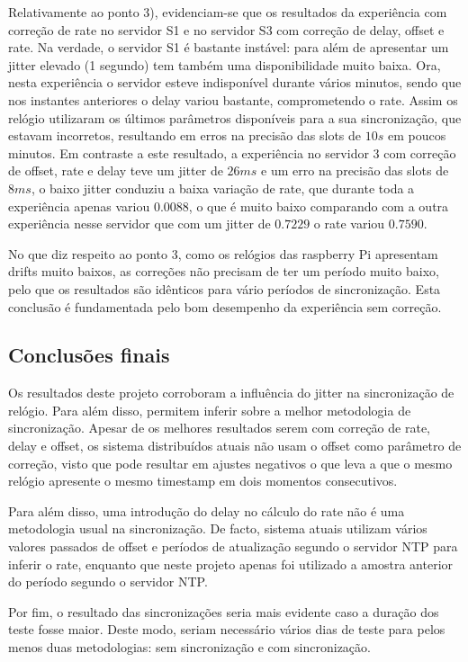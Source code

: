 Relativamente ao ponto 3), evidenciam-se que os resultados da experiência com correção de rate no servidor S1 e no servidor S3 com correção de delay, offset e rate. Na verdade, o servidor S1 é bastante instável: para além de apresentar um jitter elevado (1 segundo) tem também uma disponibilidade muito baixa. Ora, nesta experiência o servidor esteve indisponível durante vários minutos, sendo que nos instantes anteriores o delay variou bastante, comprometendo o rate. Assim os relógio utilizaram os últimos parâmetros disponíveis para a sua sincronização, que estavam incorretos, resultando em erros na precisão das slots de $10 s$ em poucos minutos. Em contraste a este resultado, a experiência no servidor 3 com correção de offset, rate e delay teve um jitter de $26 ms$ e um erro na precisão das slots de $8 ms$, o baixo jitter conduziu a baixa variação de rate, que durante toda a experiência apenas variou $0.0088$, o que é muito baixo comparando com a outra experiência nesse servidor que com um jitter de $0.7229$ o rate variou $0.7590$.

No que diz respeito ao ponto 3, como os relógios das raspberry Pi apresentam drifts muito baixos, as correções não precisam de ter um período muito baixo, pelo que os resultados são idênticos para vário períodos de sincronização. Esta conclusão é fundamentada pelo bom desempenho da experiência sem correção.

\subsection{Conclusões finais}

Os resultados deste projeto corroboram a influência do jitter na sincronização de relógio. Para além disso, permitem inferir sobre a melhor metodologia de sincronização. Apesar de os melhores resultados serem com correção de rate, delay e offset, os sistema distribuídos atuais não usam o offset como parâmetro de correção, visto que pode resultar em ajustes negativos o que leva a que o mesmo relógio apresente o mesmo timestamp em dois momentos consecutivos.

Para além disso, uma introdução do delay no cálculo do rate não é uma metodologia usual na sincronização. De facto, sistema atuais utilizam vários valores passados de offset e períodos de atualização segundo o servidor NTP para inferir o rate, enquanto que neste projeto apenas foi utilizado a amostra anterior do período segundo o servidor NTP.

Por fim, o resultado das sincronizações seria mais evidente caso a duração dos teste fosse maior. Deste modo, seriam necessário vários dias de teste para pelos menos duas metodologias: sem sincronização e com sincronização.


